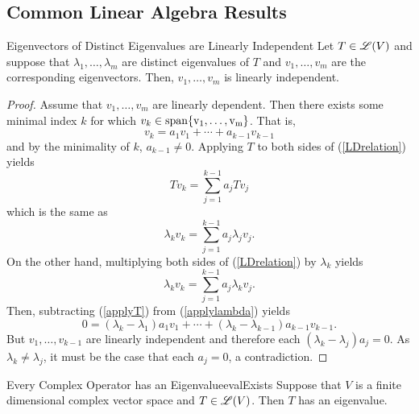 \documentclass[../AlgebraQualSolutions.tex]{subfiles}
\begin{document}
\subsection{Common Linear Algebra Results}

\begin{prop}{Eigenvectors of Distinct Eigenvalues are Linearly Independent}{}
    Let $T \in \mathscr{L}(V)$ and suppose that $\lambda_1,\ldots, \lambda_m$ are distinct eigenvalues of $T$ and $v_1,\ldots,v_m$ are the corresponding eigenvectors. Then, $v_1,\ldots,v_m$ is linearly independent.
\end{prop}

\begin{proof}
    Assume that $v_1,\ldots, v_m$ are linearly dependent. Then there exists some minimal index $k$ for which $v_k \in \rm{span}\{v_1,\ldots,v_m\}$. That is,
        \begin{equation} v_k = a_1v_1 + \cdots + a_{k-1}v_{k-1} \label{LDrelation}\end{equation}
    and by the minimality of $k$, $a_{k-1} \neq 0$. Applying $T$ to both sides of (\ref{LDrelation}) yields
        \begin{equation} Tv_k = \sum_{j=1}^{k-1} a_jTv_j\end{equation}
    which is the same as
        \begin{equation} \lambda_k v_k = \sum_{j=1}^{k-1} a_j\lambda_jv_j\label{applyT}.\end{equation}
    On the other hand, multiplying both sides of (\ref{LDrelation}) by $\lambda_k$ yields
        \begin{equation} \lambda_k v_k = \sum_{j=1}^{k-1} a_j\lambda_kv_j\label{applylambda}.\end{equation}
    Then, subtracting (\ref{applyT}) from (\ref{applylambda}) yields
        \[0 = (\lambda_k - \lambda_1)a_1 v_1 + \cdots + (\lambda_k - \lambda_{k-1})a_{k-1}v_{k-1}.\]
    But $v_1,\ldots,v_{k-1}$ are linearly independent and therefore each $(\lambda_k - \lambda_j)a_j = 0$. As $\lambda_k \neq \lambda_j$, it must be the case that each $a_j = 0$, a contradiction.
\end{proof}

\gap

\begin{prop}{Every Complex Operator has an Eigenvalue}{evalExists}
    Suppose that $V$ is a finite dimensional complex vector space and $T \in \mathscr{L}(V)$. Then $T$ has an eigenvalue.
\end{prop}
\end{document}
